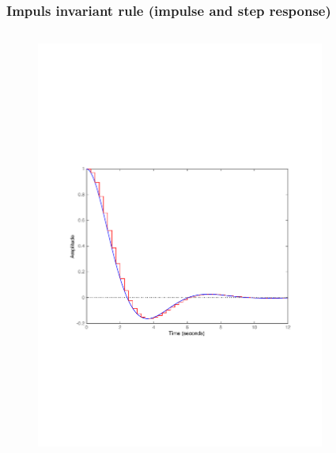 \begin{frame}
	\frametitle{Impuls invariant rule (impulse and step response)}
	\vspace{-0.7em}
	\begin{columns}
		\begin{column}{0.5\textwidth}
			\begin{figure}
				\centering
				\includegraphics[width=1\linewidth]{vb3I}
			\end{figure}
		\end{column}
		\begin{column}{0.5\textwidth}
			\begin{figure}
				\centering

\end{figure}
\end{column}
\end{columns}
\end{frame}
